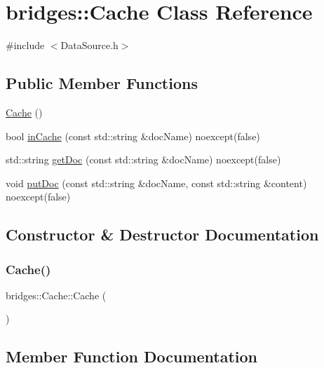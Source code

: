 \hypertarget{classbridges_1_1_cache}{}\section{bridges\+::Cache Class Reference}
\label{classbridges_1_1_cache}


{\ttfamily \#include $<$Data\+Source.\+h$>$}

\subsection*{Public Member Functions}
\begin{DoxyCompactItemize}
\item 
\mbox{\hyperlink{classbridges_1_1_cache_a8928b7b0371256bece3254c6b5399eaa}{Cache}} ()
\item 
bool \mbox{\hyperlink{classbridges_1_1_cache_a47b9bd1b61a90f2844b4220337dd10fe}{in\+Cache}} (const std\+::string \&doc\+Name) noexcept(false)
\item 
std\+::string \mbox{\hyperlink{classbridges_1_1_cache_ade9849447cc907e4ee58b543f426bf76}{get\+Doc}} (const std\+::string \&doc\+Name) noexcept(false)
\item 
void \mbox{\hyperlink{classbridges_1_1_cache_ac289170b26980f80e6789f40561b5a95}{put\+Doc}} (const std\+::string \&doc\+Name, const std\+::string \&content) noexcept(false)
\end{DoxyCompactItemize}


\subsection{Constructor \& Destructor Documentation}
\mbox{\label{classbridges_1_1_cache_a8928b7b0371256bece3254c6b5399eaa}} 
\subsubsection{\texorpdfstring{Cache()}{Cache()}}
{\footnotesize\ttfamily bridges\+::\+Cache\+::\+Cache (\begin{DoxyParamCaption}{ }\end{DoxyParamCaption})\hspace{0.3cm}{\ttfamily [inline]}}



\subsection{Member Function Documentation}
\mbox{\label{classbridges_1_1_cache_ade9849447cc907e4ee58b543f426bf76}} 
